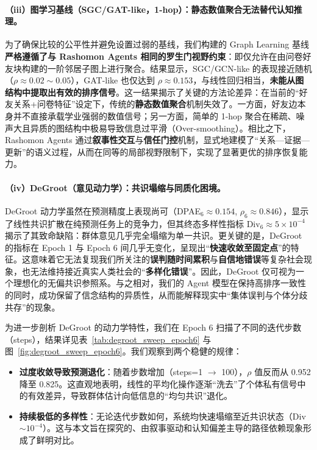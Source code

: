 \documentclass[UTF8, a4paper, 11pt]{ctexart}
\begin{document}
\paragraph{（iii）图学习基线（SGC/GAT-like，1-hop）：静态数值聚合无法替代认知推理。}
为了确保比较的公平性并避免设置过弱的基线，我们构建的 Graph Learning 基线\textbf{严格遵循了与 Rashomon Agents 相同的罗生门视野约束}：即仅允许在由问卷好友块构建的一阶邻居子图上进行聚合。结果显示，SGC/GCN-like 的表现接近随机（\(\rho\approx 0.02\sim 0.05\)），GAT-like 也仅达到 \(\rho\approx 0.153\)，与线性回归相当，\textbf{未能从图结构中提取出有效的排序信号}。这一结果揭示了关键的方法论差异：在当前的“好友关系+问卷特征”设定下，传统的\textbf{静态数值聚合}机制失效了。一方面，好友边本身并不直接承载学业强弱的数值信号；另一方面，简单的 1-hop 聚合在稀疏、噪声大且异质的图结构中极易导致信息过平滑（Over-smoothing）。相比之下，Rashomon Agents 通过\textbf{叙事性交互}与\textbf{信任门控}机制，显式地建模了“关系—证据—更新”的语义过程，从而在同等的局部视野限制下，实现了显著更优的排序恢复能力。

\paragraph{（iv）DeGroot（意见动力学）：共识塌缩与同质化困境。}
DeGroot 动力学虽然在预测精度上表现尚可（DPAE$_6 \approx 0.154$, \(\rho_6\approx 0.846\)），显示了线性共识扩散在纯预测任务上的竞争力，但其终态多样性指标 Div$_6\approx 5\times 10^{-4}$ 揭示了其致命缺陷：群体意见几乎完全塌缩为单一共识。更关键的是，DeGroot 的指标在 Epoch 1 与 Epoch 6 间几乎无变化，呈现出“\textbf{快速收敛至固定点}”的特征。这意味着它无法复现我们所关注的\textbf{误判随时间累积}与\textbf{自信地错误}等复杂社会现象，也无法维持接近真实人类社会的“\textbf{多样化错误}”。因此，DeGroot 仅可视为一个理想化的无偏共识参照系。与之相对，我们的 Agent 模型在保持高排序一致性的同时，成功保留了信念结构的异质性，从而能解释现实中“集体误判与个体分歧共存”的现象。

为进一步剖析 DeGroot 的动力学特性，我们在 Epoch 6 扫描了不同的迭代步数（steps），结果详见表~\ref{tab:degroot_sweep_epoch6} 与图~\ref{fig:degroot_sweep_epoch6}。我们观察到两个稳健的规律：
\begin{itemize}
    \item \textbf{过度收敛导致预测退化}：随着步数增加（steps=1 $\to$ 100），\(\rho\) 值反而从 0.952 降至 0.825。这直观地表明，线性的平均化操作逐渐“洗去”了个体私有信号中的有效差异，导致群体估计向低信息的“均匀共识”退化。
    \item \textbf{持续极低的多样性}：无论迭代步数如何，系统均快速塌缩至近共识状态（Div $\sim 10^{-4}$）。这与本文旨在探究的、由叙事驱动和认知偏差主导的路径依赖现象形成了鲜明对比。
\end{itemize}
\end{document}
